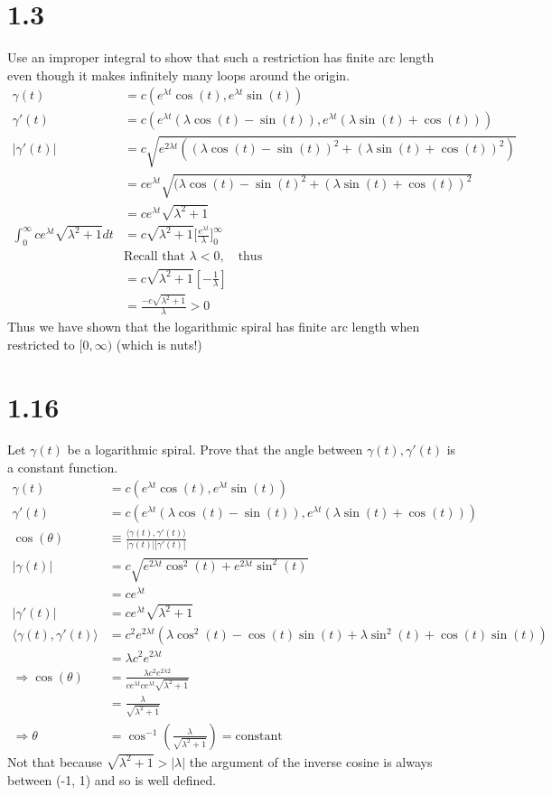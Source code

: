 \documentclass[a4paper, 11pt]{article}
\begin{document}
\section*{1.3}
	Use an improper integral to show that such a restriction has finite arc length even though it makes infinitely many loops around the origin. 
		\begin{align*}
			\gamma(t) &= c(e^{\lambda t}\cos(t), e^{\lambda t}\sin(t)) \\ 
			\gamma'(t) &= c(e^{\lambda t}(\lambda\cos(t)-\sin(t)),e^{\lambda t}(\lambda\sin(t)+\cos(t))) \\
			|\gamma'(t)| &= c\sqrt{e^{2\lambda t}((\lambda\cos(t)-\sin(t))^2+(\lambda\sin(t)+\cos(t))^2)} \\ 
			&= ce^{\lambda t}\sqrt{(\lambda\cos(t)-\sin(t)^2+(\lambda\sin(t)+\cos(t))^2} \\ 
			&= ce^{\lambda t}\sqrt{\lambda^2+1} \\ 
			\int_0^{\infty} ce^{\lambda t}\sqrt{\lambda^2+1}dt &= c\sqrt{\lambda^2+1}\Big[\frac{e^{\lambda t}}{\lambda}\Big]_0^{\infty} \\ 
			&\text{Recall that }\lambda <0, \quad \text{thus} \\ 
			&= c\sqrt{\lambda^2+1}[-\frac{1}{\lambda}] \\ 
			&= \frac{-c\sqrt{\lambda^2+1}}{\lambda} > 0
		\end{align*}	
	Thus we have shown that the logarithmic spiral has finite arc length when restricted to $[0,\infty)$ (which is nuts!)

\section*{1.16}
Let $\gamma(t)$ be a logarithmic spiral. Prove that the angle between $\gamma(t), \gamma'(t)$ is a constant function. 
	\begin{align*}
		\gamma(t) &= c(e^{\lambda t}\cos(t), e^{\lambda t}\sin(t)) \\ 
		\gamma'(t) &= c(e^{\lambda t}(\lambda\cos(t)-\sin(t)),e^{\lambda t}(\lambda\sin(t)+\cos(t))) \\
		\cos(\theta) &\equiv \frac{\langle \gamma(t), \gamma'(t)\rangle}{|\gamma(t)||\gamma'(t)|} \\ 
		|\gamma(t)| &= c\sqrt{e^{2\lambda t}\cos^2(t)+e^{2\lambda t}\sin^2(t)} \\ 
			&= ce^{\lambda t} \\ 
		|\gamma'(t)| &= ce^{\lambda t}\sqrt{\lambda^2 + 1} \\ 
		\langle \gamma(t),\gamma'(t)\rangle &= c^2e^{2\lambda t}(\lambda\cos^2(t)-\cos(t)\sin(t)+\lambda\sin^2(t)+\cos(t)\sin(t))\\ 
		&= \lambda c^2e^{2\lambda t} \\ 
		\Rightarrow \cos(\theta) &= \frac{\lambda c^2e^{2\lambda 2}}{ce^{\lambda t}ce^{\lambda t}\sqrt{\lambda^2+1}} \\ 
		&= \frac{\lambda}{\sqrt{\lambda^2+1}}\\
		\Rightarrow \theta &= \cos^{-1}(\frac{\lambda}{\sqrt{\lambda^2+1}}) = \text{constant}
	\end{align*}
	Not that because $\sqrt{\lambda^2 +1} > |\lambda|$ the argument of the inverse cosine is always between (-1, 1) and so is well defined. 
\end{document}
